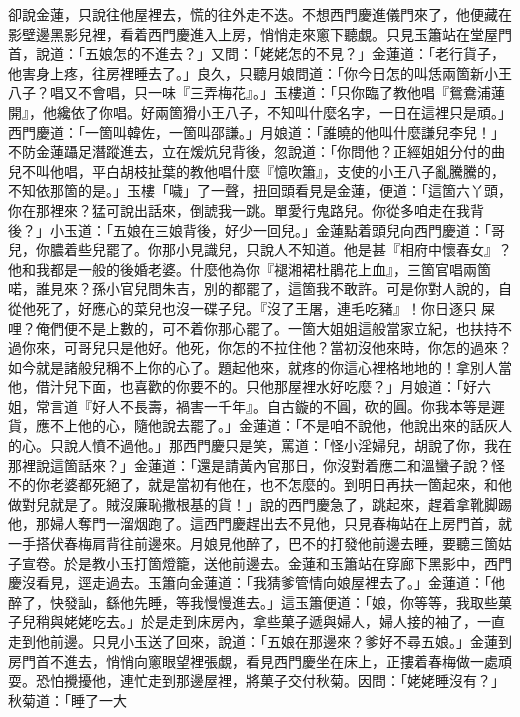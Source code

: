 卻說金蓮，只說往他屋裡去，慌的往外走不迭。不想西門慶進儀門來了，他便藏在影壁邊黑影兒裡，看着西門慶進入上房，悄悄走來窻下聽覷。{}只見玉簫站在堂屋門首，說道：「五娘怎的不進去？」又問：「姥姥怎的不見？」金蓮道：「老行貨子，他害身上疼，往房裡睡去了。」良久，只聽月娘問道：「你今日怎的叫恁兩箇新小王八子？唱又不會唱，只一味『三弄梅花』。」玉樓道：「只你臨了教他唱『鴛鴦浦蓮開』，他纔依了你唱。好兩箇猾小王八子，不知叫什麼名字，一日在這裡只是頑。」西門慶道：「一箇叫韓佐，一箇叫邵謙。」月娘道：「誰曉的他叫什麼謙兒李兒！」不防金蓮躡足潛蹤進去，立在煖炕兒背後，忽說道：「你問他？正經姐姐分付的曲兒不叫他唱，平白胡枝扯葉的教他唱什麼『憶吹簫』，支使的小王八子亂騰騰的，不知依那箇的是。」玉樓「噦」了一聲，扭回頭看見是金蓮，便道：「這箇六丫頭，你在那裡來？猛可說出話來，倒諕我一跳。{}單愛行鬼路兒。你從多咱走在我背後？」小玉道：「五娘在三娘背後，好少一回兒。」金蓮點着頭兒向西門慶道：「哥兒，你膿着些兒罷了。你那小見識兒，只說人不知道。他是甚『相府中懷春女』？他和我都是一般的後婚老婆。{}什麼他為你『褪湘裙杜鵑花上血』，三箇官唱兩箇喏，誰見來？孫小官兒問朱吉，別的都罷了，這箇我不敢許。可是你對人說的，自從他死了，好應心的菜兒也沒一碟子兒。『沒了王屠，連毛吃豬』！你日逐只𠳹屎哩？俺們便不是上數的，可不着你那心罷了。一箇大姐姐這般當家立紀，也扶持不過你來，{}可哥兒只是他好。他死，你怎的不拉住他？當初沒他來時，你怎的過來？如今就是諸般兒稱不上你的心了。題起他來，就疼的你這心裡格地地的！拿別人當他，借汁兒下面，{}也喜歡的你要不的。只他那屋裡水好吃麼？」月娘道：「好六姐，常言道『好人不長壽，禍害一千年』。{}自古鏇的不圓，砍的圓。你我本等是遲貨，應不上他的心，隨他說去罷了。」金蓮道：「不是咱不說他，他說出來的話灰人的心。只說人憤不過他。」那西門慶只是笑，罵道：「怪小淫婦兒，胡說了你，我在那裡說這箇話來？」金蓮道：「還是請黃內官那日，{}你沒對着應二和溫蠻子說？{}怪不的你老婆都死絕了，就是當初有他在，也不怎麼的。到明日再扶一箇起來，和他做對兒就是了。{}賊沒廉恥撒根基的貨！」說的西門慶急了，跳起來，趕着拿靴脚踢他，那婦人奪門一溜烟跑了。{}這西門慶趕出去不見他，只見春梅站在上房門首，就一手搭伏春梅肩背往前邊來。{}月娘見他醉了，巴不的打發他前邊去睡，要聽三箇姑子宣卷。於是教小玉打箇燈籠，送他前邊去。金蓮和玉簫站在穿廊下黑影中，西門慶沒看見，逕走過去。玉簫向金蓮道：「我猜爹管情向娘屋裡去了。」金蓮道：「他醉了，快發訕，{}繇他先睡，等我慢慢進去。」{}這玉簫便道：「娘，你等等，我取些菓子兒稍與姥姥吃去。」{}於是走到床房內，拿些菓子遞與婦人，婦人接的袖了，一直走到他前邊。只見小玉送了回來，說道：「五娘在那邊來？爹好不尋五娘。」金蓮到房門首不進去，悄悄向窻眼望裡張覷，看見西門慶坐在床上，正摟着春梅做一處頑耍。恐怕攪擾他，連忙走到那邊屋裡，將菓子交付秋菊。因問：「姥姥睡沒有？」秋菊道：「睡了一大